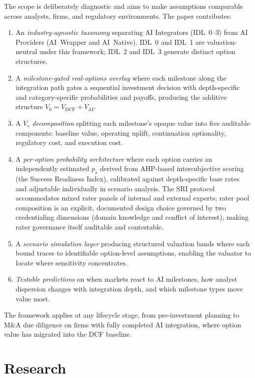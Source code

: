 \documentclass[oneside,10pt]{swissi}
\begin{document}
The scope is deliberately diagnostic and aims to make assumptions comparable across analysts, firms, and regulatory environments. The paper contributes:

\begin{enumerate}
  \item An \emph{industry-agnostic taxonomy} separating AI Integrators (IDL~0--3) from AI Providers (AI~Wrapper and AI~Native). IDL~0 and IDL~1 are valuation-neutral under this framework; IDL~2 and IDL~3 generate distinct option structures.
  \item A \emph{milestone-gated real-options overlay} where each milestone along the integration path gates a sequential investment decision with depth-specific and category-specific probabilities and payoffs, producing the additive structure $V_0 = V_{\mathrm{DCF}} + V_{\mathrm{AI}}$.
  \item A \emph{$V_s$ decomposition} splitting each milestone's opaque value into five auditable components: baseline value, operating uplift, continuation optionality, regulatory cost, and execution cost.
  \item A \emph{per-option probability architecture} where each option carries an independently estimated $p_s$ derived from AHP-based intersubjective scoring (the Success Readiness Index), calibrated against depth-specific base rates and adjustable individually in scenario analysis. The SRI protocol accommodates mixed rater panels of internal and external experts; rater pool composition is an explicit, documented design choice governed by two credentialing dimensions (domain knowledge and conflict of interest), making rater governance itself auditable and contestable.
  \item A \emph{scenario simulation layer} producing structured valuation bands where each bound traces to identifiable option-level assumptions, enabling the valuator to locate where sensitivity concentrates.
  \item \emph{Testable predictions} on when markets react to AI milestones, how analyst dispersion changes with integration depth, and which milestone types move value most.
\end{enumerate}

The framework applies at any lifecycle stage, from pre-investment planning to M\&A due diligence on firms with fully completed AI integration, where option value has migrated into the DCF baseline.

\section{Research}
\end{document}
